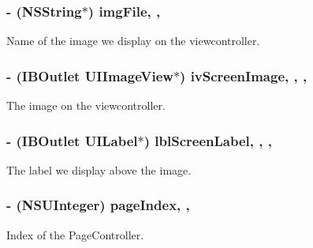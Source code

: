 \subsubsection[{img\+File}]{\setlength{\rightskip}{0pt plus 5cm}-\/ (N\+S\+String$\ast$) img\+File\hspace{0.3cm}{\ttfamily [read]}, {\ttfamily [write]}, {\ttfamily [atomic]}}\label{interface_e_s_page_view_controller_ac2b73c2572d8221b108e2c7a79d7e4eb}
Name of the image we display on the viewcontroller. \hypertarget{interface_e_s_page_view_controller_af89fee72967118c2b6223647191cf380}{}
\subsubsection[{iv\+Screen\+Image}]{\setlength{\rightskip}{0pt plus 5cm}-\/ (I\+B\+Outlet U\+I\+Image\+View$\ast$) iv\+Screen\+Image\hspace{0.3cm}{\ttfamily [read]}, {\ttfamily [write]}, {\ttfamily [nonatomic]}, {\ttfamily [strong]}}\label{interface_e_s_page_view_controller_af89fee72967118c2b6223647191cf380}
The image on the viewcontroller. \hypertarget{interface_e_s_page_view_controller_a37a2106faf34602108ad2d3303ab8bdc}{}
\subsubsection[{lbl\+Screen\+Label}]{\setlength{\rightskip}{0pt plus 5cm}-\/ (I\+B\+Outlet U\+I\+Label$\ast$) lbl\+Screen\+Label\hspace{0.3cm}{\ttfamily [read]}, {\ttfamily [write]}, {\ttfamily [nonatomic]}, {\ttfamily [strong]}}\label{interface_e_s_page_view_controller_a37a2106faf34602108ad2d3303ab8bdc}
The label we display above the image. \hypertarget{interface_e_s_page_view_controller_acd8b6a09ffbec0851c2a21f82ff4cb59}{}
\subsubsection[{page\+Index}]{\setlength{\rightskip}{0pt plus 5cm}-\/ (N\+S\+U\+Integer) page\+Index\hspace{0.3cm}{\ttfamily [read]}, {\ttfamily [write]}, {\ttfamily [atomic]}}\label{interface_e_s_page_view_controller_acd8b6a09ffbec0851c2a21f82ff4cb59}
Index of the Page\+Controller. \hypertarget{interface_e_s_page_view_controller_a6bdeac95e5afc8ef09c069a9d32e80bc}{}
